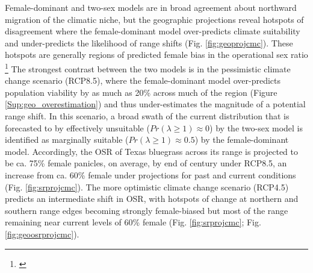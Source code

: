 \documentclass[12pt]{article}\usepackage[]{graphicx}\usepackage[dvipsnames]{xcolor}
\newcommand{\tom}[2]{{\color{red}{#1}}\footnote{\textit{\color{red}{#2}}}}
\begin{document}
Female-dominant and two-sex models are in broad agreement about northward migration of the climatic niche, but the geographic projections reveal hotspots of disagreement where the female-dominant model over-predicts climate suitability and under-predicts the likelihood of range shifts (Fig. \ref{fig:geoprojcmc}). 
These hotspots are generally regions of predicted female bias in the operational sex ratio \tom{(Figure \ref{fig:geoosrprojcmc}). }{I really like this figure but it might work better as a supplement figure--let's discuss. It suggests for example that the range size will actually increase under RCP4.5. YOu also need to update the legend.}
The strongest contrast between the two models is in the pessimistic climate change scenario (RCP8.5), where the female-dominant model over-predicts population viability by as much as 20\% across much of the region (Figure \ref{Sup:geo_overestimation}) and thus under-estimates the magnitude of a potential range shift. 
In this scenario, a broad swath of the current distribution that is forecasted to by effectively unsuitable ($Pr(\lambda \ge 1) \approx 0$) by the two-sex model is identified as marginally suitable ($Pr(\lambda \ge 1) \approx 0.5$) by the female-dominant model. 
Accordingly, the OSR of Texas bluegrass across its range is projected to be ca. 75\% female panicles, on average, by end of century under RCP8.5, an increase from ca. 60\% female under projections for past and current conditions (Fig. \ref{fig:srprojcmc}). 
The more optimistic climate change scenario (RCP4.5) predicts an intermediate shift in OSR, with hotspots of change at northern and southern range edges becoming strongly female-biased but most of the range remaining near current levels of 60\% female (Fig. \ref{fig:srprojcmc}; Fig. \ref{fig:geoosrprojcmc}). 
\end{document}
